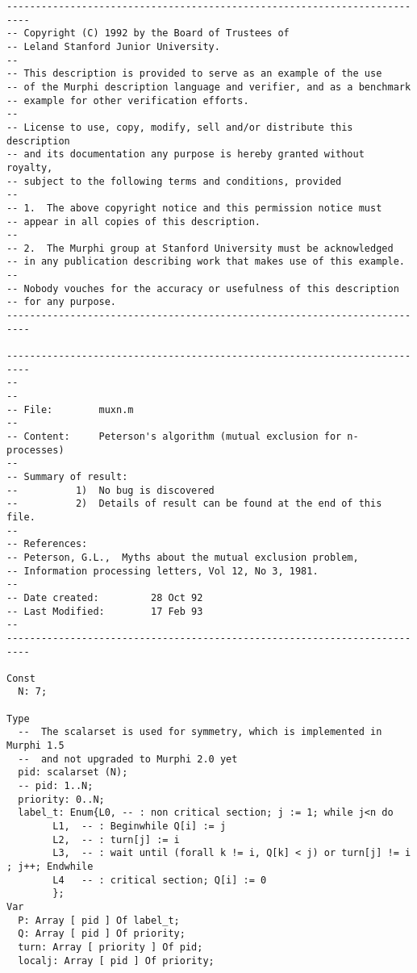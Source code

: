 \documentclass[11pt]{article}
\begin{document}
\begin{tiny}
\begin{verbatim}
--------------------------------------------------------------------------
-- Copyright (C) 1992 by the Board of Trustees of 			  
-- Leland Stanford Junior University.					  
--									  
-- This description is provided to serve as an example of the use	  
-- of the Murphi description language and verifier, and as a benchmark	  
-- example for other verification efforts.				  
--									  
-- License to use, copy, modify, sell and/or distribute this description  
-- and its documentation any purpose is hereby granted without royalty,   
-- subject to the following terms and conditions, provided		  
--									  
-- 1.  The above copyright notice and this permission notice must	  
-- appear in all copies of this description.				  
-- 									  
-- 2.  The Murphi group at Stanford University must be acknowledged	  
-- in any publication describing work that makes use of this example. 	  
-- 									  
-- Nobody vouches for the accuracy or usefulness of this description	  
-- for any purpose.							  
--------------------------------------------------------------------------

--------------------------------------------------------------------------
--
--                                                                        
-- File:        muxn.m                                                    
--                                                                        
-- Content:     Peterson's algorithm (mutual exclusion for n-processes)   
--                                                                        
-- Summary of result:                                                     
--          1)  No bug is discovered 					  
--          2)  Details of result can be found at the end of this file.   
--                                                                        
-- References: 						       	       	  
-- Peterson, G.L.,  Myths about the mutual exclusion problem,             
-- Information processing letters, Vol 12, No 3, 1981.                    
--                                                                        
-- Date created:         28 Oct 92                                        
-- Last Modified:        17 Feb 93                                        
--                                                                        
--------------------------------------------------------------------------

Const
  N: 7;	

Type
  --  The scalarset is used for symmetry, which is implemented in Murphi 1.5
  --  and not upgraded to Murphi 2.0 yet
  pid: scalarset (N);
  -- pid: 1..N;
  priority: 0..N;
  label_t: Enum{L0, -- : non critical section; j := 1; while j<n do
		L1,  -- : Beginwhile Q[i] := j
		L2,  -- : turn[j] := i
		L3,  -- : wait until (forall k != i, Q[k] < j) or turn[j] != i ; j++; Endwhile
		L4   -- : critical section; Q[i] := 0
 		};
Var
  P: Array [ pid ] Of label_t;
  Q: Array [ pid ] Of priority;
  turn: Array [ priority ] Of pid;
  localj: Array [ pid ] Of priority;


\end{verbatim}
\end{tiny}
\end{document}
